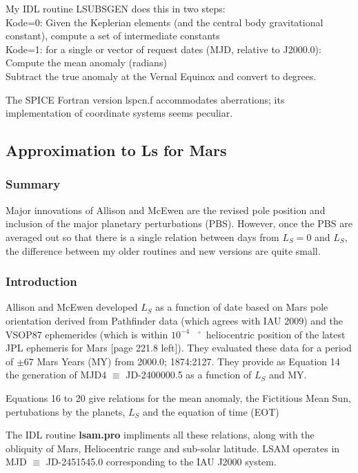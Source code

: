 \documentclass[draft]{article}
\newcommand{\qi}{\\ \hspace*{2.em}}      %
\newcommand{\qd}{$^\circ$}        %
\newcommand{\np}{\textbf}  %
\newcommand{\Em}[1]{$10^{-#1} $}        %
\begin{document}
My IDL routine LSUBSGEN does this in two steps:
\\ Kode=0: Given the Keplerian elements (and the central body gravitational
constant), compute a set of intermediate constants
\\ Kode=1: for a single or vector of request dates (MJD, relative to J2000.0):
\qi Compute the mean anomaly (radians)
\qi Subtract the true anomaly at the Vernal Equinox and convert to degrees.

The SPICE Fortran version lspcn.f accommodates aberrations; its implementation of
coordinate systems seems peculiar.


\subsection{Approximation to Ls for Mars}
\subsubsection{Summary} 
Major innovations of Allison and McEwen are the revised pole position and
inclusion of the major planetary perturbations (PBS). However, once the PBS are
averaged out so that there is a single relation between days from $L_S=0$ and
$L_S$, the difference between my older routines and new versions are quite small.

\subsubsection{Introduction} %
 Allison and McEwen \cite{Allison00} developed $L_S$ as a function of date based
 on Mars pole orientation derived from Pathfinder data (which agrees with IAU
 2009) and the VSOP87 ephemerides (which is within \Em4 \ \qd ~heliocentric
 position of the latest JPL ephemeris for Mars [page 221.8 left]).  They
 evaluated these data for a period of $\pm 67$ Mars Years (MY) from 2000.0;
 1874:2127.  They provide as Equation 14 the generation of MJD4 $\equiv$
 JD-2400000.5 as a function of $L_S$ and MY.

Equations 16 to 20 give relations for the mean anomaly, the Fictitious Mean Sun,
pertubations by the planets, $L_S$ and the equation of time (EOT)

The IDL routine \np{lsam.pro} impliments all these relations, along with the
obliquity of Mars, Heliocentric range and sub-solar latitude. LSAM operates in
MJD $\equiv$ JD-2451545.0 corresponding to the IAU J2000 system.
\end{document}
